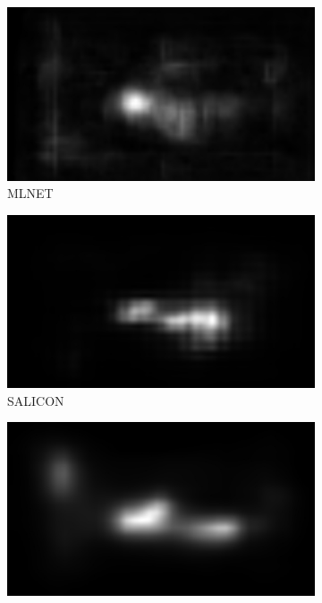 \begin{figure}[ht]
    \begin{subfigure}{0.24\textwidth}
        \includegraphics[width=\linewidth]{datas/predictions/mlnet_cows_at_a_pond_Bilders_1856.jpg}
        \caption{MLNET}
    \end{subfigure}
    \begin{subfigure}{0.24\textwidth}
        \includegraphics[width=\linewidth]{datas/predictions/SALICON_cows_at_a_pond_Bilders_1856.jpg}
        \caption{SALICON}
    \end{subfigure}
    \begin{subfigure}{0.24\textwidth}
        \includegraphics[width=\linewidth]{datas/predictions/sam_vgg_cows_at_a_pond_Bilders_1856.jpg}

\end{subfigure}
\end{figure}
